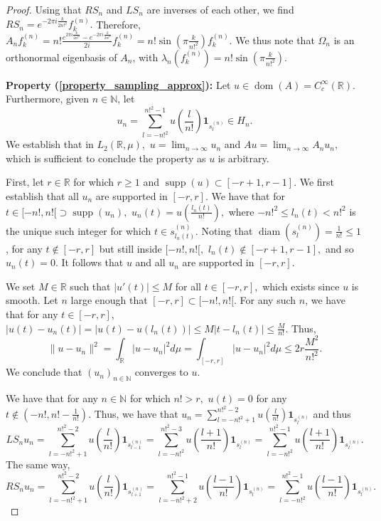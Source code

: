 \documentclass[10pt,a4paper]{amsart}
\def \Dom{\operatorname{dom}}
\begin{document}
\begin{proof}
	Using that $RS_n$ and $LS_n$ are inverses of each other, we find $RS_n=e^{-2\pi i\frac{k}{2n!^2}} f_k^{(n)}.$ Therefore, $A_nf_k^{(n)}=n!\frac{e^{2\pi i\frac{k}{2n!^2}}-e^{-2\pi i\frac{k}{2n!^2}}}{2i}f_k^{(n)}=n!\sin\left(\pi\frac{k}{n!^2}\right)f_k^{(n)}.$ We thus note that $\Omega_n$ is an orthonormal eigenbasis of $A_n$, with $\lambda_n(f_k^{(n)})=n!\sin\left(\pi\frac{k}{n!^2}\right).$
	
	\textbf{Property (\ref{property_sampling_approx}):} Let $u\in \Dom(A)=C_c^{\infty}(\mathbb{R}).$ Furthermore, given $n\in\mathbb{N}$, let $$u_n=\sum_{l=-n!^2}^{n!^2-1} u(\frac{l}{n!})\mathbf{1}_{s_l^{(n)}}\in H_n.$$ We establish that in $L_2(\mathbb{R},\mu),$ $u=\lim_{n\rightarrow\infty}u_n$ and $Au=\lim_{n\rightarrow\infty} A_nu_n,$ which is sufficient to conclude the property as $u$ is arbitrary.
	
	First, let $r\in\mathbb{R}$ for which $r\geq 1$ and $\operatorname{supp}(u)\subset [-r+1,r-1].$ We first establish that all $u_n$ are supported in $[-r,r].$ We have that for $t\in[-n!,n![\supset \operatorname{supp}(u_n),$ $u_n(t)=u(\frac{l_n(t)}{n!}),$ where $-n!^2\leq l_n(t)< n!^2$ is the unique such integer for which $t\in s_{l_n(t)}^{(n)}.$ Noting that $\operatorname{diam}(s_l^{(n)})=\frac{1}{n!}\leq 1$ , for any $t\notin [-r,r]$ but still inside $[-n!,n![,$ $l_n(t)\notin [-r+1,r-1],$ and so $u_n(t)=0.$ It follows that $u$ and all $u_n$ are supported in $[-r,r]$. 
	
	We set $M\in\mathbb{R}$ such that $|u'(t)|\leq M$ for all $t\in[-r,r],$ which exists since $u$ is smooth.  Let $n$ large enough that $[-r,r]\subset [-n!, n![.$ For any such $n$, we have that for any $t\in[-r,r]$, $|u(t)-u_n(t)|=|u(t)-u(l_n(t))|\leq M|t-l_n(t)|\leq\frac{M}{n!}.$ Thus, $$\|u-u_n\|^2=\int_{\mathbb{R}}|u-u_n|^2d\mu=\int_{[-r,r]}|u-u_n|^2d\mu\leq 2r\frac{M^2}{n!^2}.$$ We conclude that $(u_n)_{n\in\mathbb{N}}$ converges to $u$.
	
	We have that for any $n\in\mathbb{N}$ for which $n!>r,$ $u(t)=0$ for any $t\notin(-n!,n!-\frac{1}{n!}).$ Thus, we have that $u_n=\sum_{l=-n!^2+1}^{n!^2-2} u(\frac{l}{n!})\mathbf{1}_{s_l^{(n)}}$ and thus $$LS_nu_n=\sum_{l=-n!^2+1}^{n!^2-2} u(\frac{l}{n!})\mathbf{1}_{s_{l-1}^{(n)}}=\sum_{l=-n!^2}^{n!^2-3}u(\frac{l+1}{n!})\mathbf{1}_{s_l^{(n)}}=\sum_{l=-n!^2}^{n!^2-1}u(\frac{l+1}{n!})\mathbf{1}_{s_l^{(n)}}.$$ The same way, $$RS_nu_n=\sum_{l=-n!^2+1}^{n!^2-2} u(\frac{l}{n!})\mathbf{1}_{s_{l+1}^{(n)}}=\sum_{l=-n!^2+2}^{n!^2-1}u(\frac{l-1}{n!})\mathbf{1}_{s_l^{(n)}}=\sum_{l=-n!^2}^{n!^2-1}u(\frac{l-1}{n!})\mathbf{1}_{s_l^{(n)}}.$$
	

\end{proof}
\end{document}
